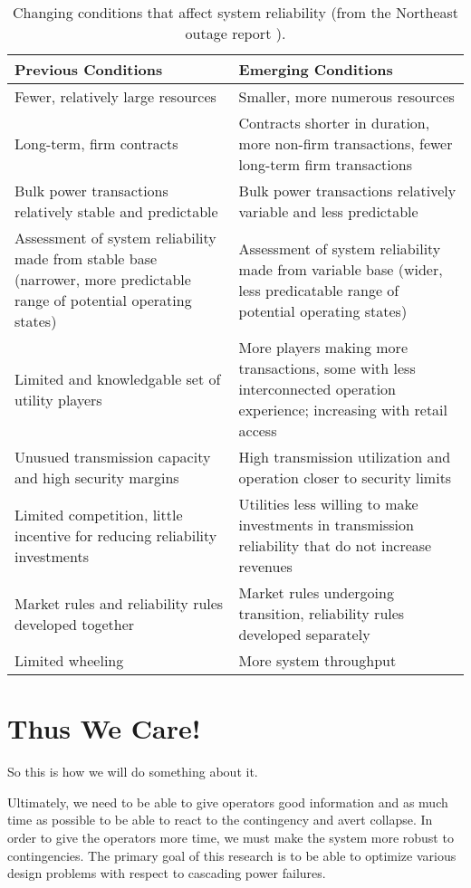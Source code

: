 \begin{table}
\centering
\footnotesize
\begin{tabular}{| p{7cm} | p{7cm} |}
\hline
\bf Previous Conditions 	&	\bf Emerging Conditions 		\\	\hline  	\hline
Fewer, relatively large resources	&	Smaller, more numerous resources		\\	\hline
Long-term, firm contracts 	&	Contracts shorter in duration, more non-firm transactions, fewer long-term firm transactions	\\	\hline
Bulk power transactions relatively stable and predictable	&	Bulk power transactions relatively variable and less predictable	\\	\hline
Assessment of system reliability made from stable base (narrower, more predictable range of potential operating states)	&	Assessment of system reliability made from variable base (wider, less predicatable range of potential operating states)		\\		\hline
Limited and knowledgable set of utility players 	&	More players making more transactions, some with less interconnected operation experience; increasing with retail access	\\	\hline
Unusued transmission capacity and high security margins	&	High transmission utilization and operation closer to security limits	\\	\hline
Limited competition, little incentive for reducing reliability investments	&	Utilities less willing to make investments in transmission reliability that do not increase revenues	\\	\hline
Market rules and reliability rules developed together	&	Market rules undergoing transition, reliability rules developed separately	\\	\hline
Limited wheeling	&	More system throughput	\\	\hline
\end{tabular}
\caption{\small Changing conditions that affect system reliability (from the Northeast outage report \cite{northeast_2003}).}
 \label{tab:change1}
\end{table}

\section{Thus We Care!}
So this is how we will do something about it.

Ultimately, we need to be able to give operators good information and as much time as possible to be able to react to the contingency and avert collapse.  In order to give the operators more time, we must make the system more robust to contingencies.  The primary goal of this research is to be able to optimize various design problems with respect to cascading power failures. 

